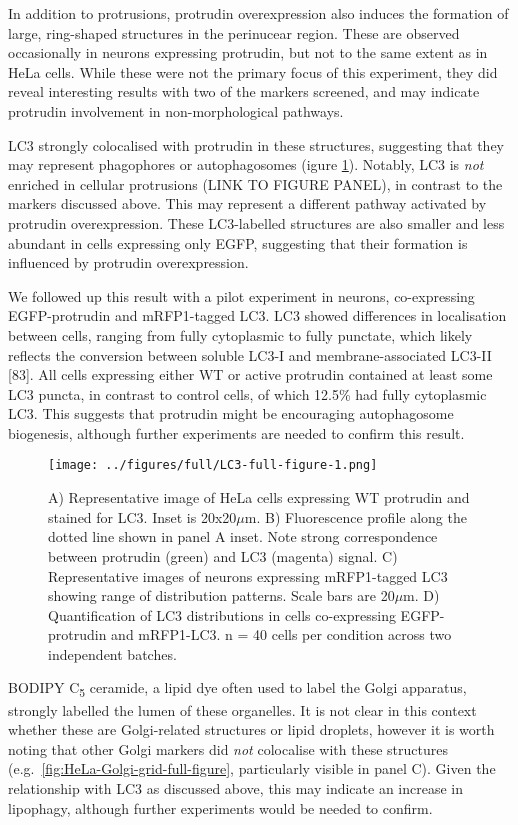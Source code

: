 \documentclass[
  12pt,
  a4paper,
]{book}
\begin{document}
In addition to protrusions, protrudin overexpression also induces the formation of large, ring-shaped structures in the perinucear region. These are observed occasionally in neurons expressing protrudin, but not to the same extent as in HeLa cells. While these were not the primary focus of this experiment, they did reveal interesting results with two of the markers screened, and may indicate protrudin involvement in non-morphological pathways.

LC3 strongly colocalised with protrudin in these structures, suggesting that they may represent phagophores or autophagosomes (igure \ref{fig:LC3-full-figure}). Notably, LC3 is \emph{not} enriched in cellular protrusions (LINK TO FIGURE PANEL), in contrast to the markers discussed above. This may represent a different pathway activated by protrudin overexpression. These LC3-labelled structures are also smaller and less abundant in cells expressing only EGFP, suggesting that their formation is influenced by protrudin overexpression.

We followed up this result with a pilot experiment in neurons, co-expressing EGFP-protrudin and mRFP1-tagged LC3. LC3 showed differences in localisation between cells, ranging from fully cytoplasmic to fully punctate, which likely reflects the conversion between soluble LC3-I and membrane-associated LC3-II {[}83{]}. All cells expressing either WT or active protrudin contained at least some LC3 puncta, in contrast to control cells, of which 12.5\% had fully cytoplasmic LC3. This suggests that protrudin might be encouraging autophagosome biogenesis, although further experiments are needed to confirm this result.

\begin{figure}
\centering
\texttt{[image: ../figures/full/LC3-full-figure-1.png]}
\caption{\label{fig:LC3-full-figure}A) Representative image of HeLa cells expressing WT protrudin and stained for LC3. Inset is 20x20\(\mu\)m. B) Fluorescence profile along the dotted line shown in panel A inset. Note strong correspondence between protrudin (green) and LC3 (magenta) signal. C) Representative images of neurons expressing mRFP1-tagged LC3 showing range of distribution patterns. Scale bars are 20\(\mu\)m. D) Quantification of LC3 distributions in cells co-expressing EGFP-protrudin and mRFP1-LC3. n = 40 cells per condition across two independent batches.}
\end{figure}

BODIPY C\textsubscript{5} ceramide, a lipid dye often used to label the Golgi apparatus, strongly labelled the lumen of these organelles. It is not clear in this context whether these are Golgi-related structures or lipid droplets, however it is worth noting that other Golgi markers did \emph{not} colocalise with these structures (e.g.~\ref{fig:HeLa-Golgi-grid-full-figure}, particularly visible in panel C). Given the relationship with LC3 as discussed above, this may indicate an increase in lipophagy, although further experiments would be needed to confirm.
\end{document}
